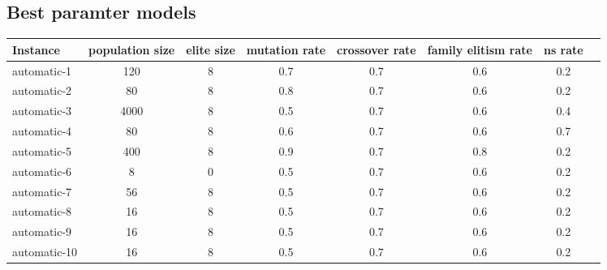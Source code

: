 \documentclass[11pt]{article}
\begin{document}
\subsection{Best paramter models}

\begin{tabular}{l*{6}{c}r}
	Instance & population size & elite size & mutation rate & crossover rate & family elitism rate & ns rate \\
	\hline
	automatic-1 & 120 & 8 & 0.7 & 0.7 & 0.6 & 0.2 \\
	automatic-2 & 80 & 8 & 0.8 & 0.7 & 0.6 & 0.2 \\
	automatic-3 & 4000 & 8 & 0.5 & 0.7 & 0.6 & 0.4 \\
	automatic-4 & 80 & 8 & 0.6 & 0.7 & 0.6 & 0.7 \\
	automatic-5 & 400 & 8 & 0.9 & 0.7 & 0.8 & 0.2 \\
	automatic-6 & 8 & 0 & 0.5 & 0.7 & 0.6 & 0.2 \\
	automatic-7 & 56 & 8 & 0.5 & 0.7 & 0.6 & 0.2 \\
	automatic-8 & 16 & 8 & 0.5 & 0.7 & 0.6 & 0.2 \\
	automatic-9 & 16 & 8 & 0.5 & 0.7 & 0.6 & 0.2 \\
	automatic-10 & 16 & 8 & 0.5 & 0.7 & 0.6 & 0.2 \\
\end{tabular}
\end{document}

